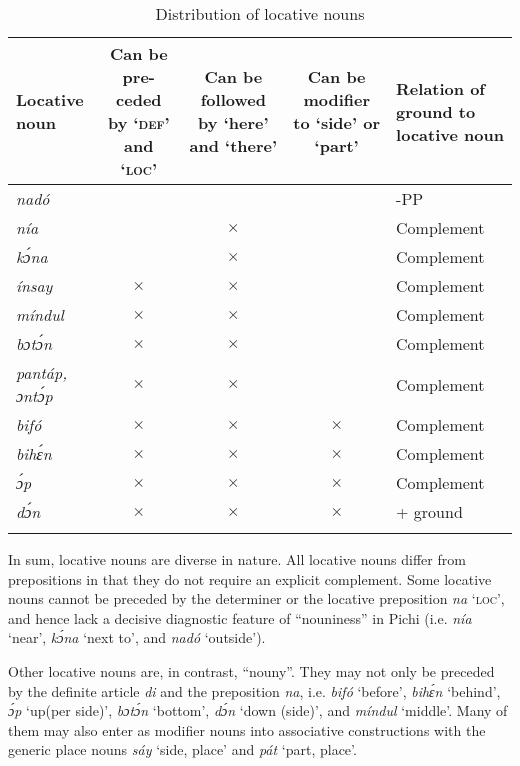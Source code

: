 \begin{table}
\caption{Distribution of locative nouns}
\label{tab:key:8.3}
\begin{tabularx}{\textwidth}{QCCCQ}
\lsptoprule
Locative noun &
  \raggedright Can be pre-ceded by  ‘\textsc{def’} and  ‘\textsc{loc’} & 
  \raggedright Can be followed by  ‘here’ and  ‘there’ & 
  \raggedright Can be modifier to  ‘side’ or  ‘part’ & Relation of ground to locative noun\\
\midrule 
\itshape nadó &  &  &  & -PP\\
\itshape nía &  & $\times$ &  & Complement\\
\itshape kɔ́na &  & $\times$ &  & Complement\\
\itshape ínsay & $\times$ & $\times$ &  & Complement\\
\itshape míndul & $\times$ & $\times$ &  & Complement\\
\itshape bɔtɔ́n & $\times$ & $\times$ &  & Complement\\
\itshape pantáp, ɔntɔ́p & $\times$ & $\times$ &  & Complement\\
\itshape bifó & $\times$ & $\times$ & $\times$ & Complement\\
\itshape bihɛ́n & $\times$ & $\times$ & $\times$ & Complement\\
\itshape ɔ́p & $\times$ & $\times$ & $\times$ & Complement\\
\itshape dɔ́n & $\times$ & $\times$ & $\times$ &  + ground\\
\lspbottomrule
\end{tabularx}
\end{table}

In sum, locative nouns are diverse in nature. All locative nouns differ from prepositions in that they do not require an explicit complement. Some locative nouns cannot be preceded by the determiner or the locative preposition \textit{na} ‘\textsc{loc}’, and hence lack a decisive diagnostic feature of “nouniness” in Pichi (i.e. \textit{nía} ‘near’, \textit{kɔ́na} ‘next to’, and \textit{nadó} ‘outside’). 


Other locative nouns are, in contrast, “nouny”. They may not only be preceded by the definite article \textit{di} and the preposition \textit{na}, i.e. \textit{bifó} ‘before’, \textit{bihɛ́n} ‘behind’, \textit{ɔ́p} ‘up(per side)’, \textit{bɔtɔ́n} ‘bottom’, \textit{dɔ́n} ‘down (side)’, and \textit{míndul} ‘middle’. Many of them may also enter as modifier nouns into associative constructions with the generic place nouns \textit{sáy} ‘side, place’ and \textit{pát} ‘part, place’.{\fff} 



